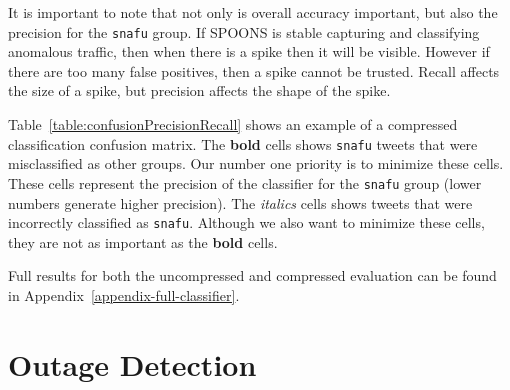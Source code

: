 \documentclass[12pt]{ucthesis}
\begin{document}
It is important to note that not only is overall accuracy important, but also the precision for the \texttt{snafu} group.
If SPOONS is stable capturing and classifying anomalous traffic, then when there is a spike then it will be visible.
However if there are too many false positives, then a spike cannot be trusted. Recall affects the size of a spike, but precision
affects the shape of the spike.

Table~\ref{table:confusionPrecisionRecall} shows an example of a compressed classification confusion matrix.
The \textbf{bold} cells shows \texttt{snafu} tweets that were misclassified as other groups. Our number one priority is to minimize these cells.
These cells represent the precision of the classifier for the \texttt{snafu} group (lower numbers generate higher precision).
The \emph{italics} cells shows tweets that were incorrectly classified as \texttt{snafu}. Although we also want to minimize these
cells, they are not as important as the \textbf{bold} cells.

\begin{table}[H]
   \begin{center}
      \caption[Misclassified Snafu]{A sample compressed classification confusion matrix showing misclassified \texttt{snafu} tweets.}
      \label{table:confusionPrecisionRecall}
   \end{center}
\end{table}

Full results for both the uncompressed and compressed evaluation can be found in Appendix~\ref{appendix-full-classifier}.



\chapter{Outage Detection}
\label{outage-detection}
\end{document}
